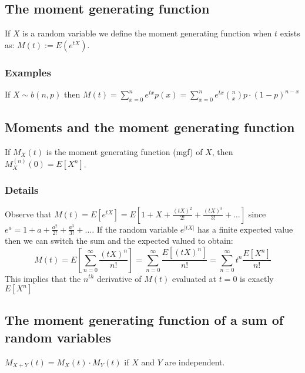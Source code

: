 \documentclass[12pt,a4paper]{article}
\theoremstyle{regla}
\theoremstyle{remark}
\theoremstyle{definition}
\theoremstyle{nonumberbreak}
\begin{document}
\subsection{The moment generating function}
\begin{fbox}
\begin{minipage}{0.97\textwidth}
If $X$ is a random variable we define the moment generating function when $t$ exists as: $M(t):=E(e^{tX})$.
\end{minipage}
\end{fbox}
\subsubsection{Examples}
\begin{xmpl}
If $X\sim b(n,p)$ then $M(t)=\displaystyle\sum_{x=0}^{n} e^{tx}p(x) = \displaystyle\sum_{x=0}^{n} e^{tx} \binom{n}{x}p\cdot (1-p)^{n-x}$ 
\end{xmpl}

\subsection{Moments and the moment generating function}
\begin{fbox}
\begin{minipage}{0.97\textwidth}
If $M_{X}(t)$ is the moment generating function (mgf) of $X$, then $M_{X}^{(n)}(0)=E[X^n]$.
\end{minipage}
\end{fbox}
\subsubsection{Details}
Observe that $M(t)=E[e^{tX}]=E[1+X+\frac{(tX)^2}{2!}+\frac{(tX)^3}{3!}+\dots]$ since $e^a=1+a+\frac{a^2}{2!}+\frac{a^3}{3!}+\dots$. If the random variable $e^{|tX|}$ has a finite expected value then we can switch the sum and the expected valued to obtain:
$$M(t)=E[\sum_{n=0}^{\infty}\frac{(tX)^n}{n!}]=\sum_{n=0}^{\infty}\frac{E[(tX)^n]}{n!}=\sum_{n=0}^{\infty}t^n\frac{E[X^n]}{n!}$$
This implies that the $n^{th}$ derivative of $M(t)$ evaluated at $t=0$ is exactly $E[X^n]$

\subsection{The moment generating function of a sum of random variables}
\begin{fbox}
\begin{minipage}{0.97\textwidth}
$M_{X+Y}(t)=M_{X}(t)\cdot M_{Y}(t)$ if $X$ and $Y$ are independent.
\end{minipage}
\end{fbox}
\end{document}
